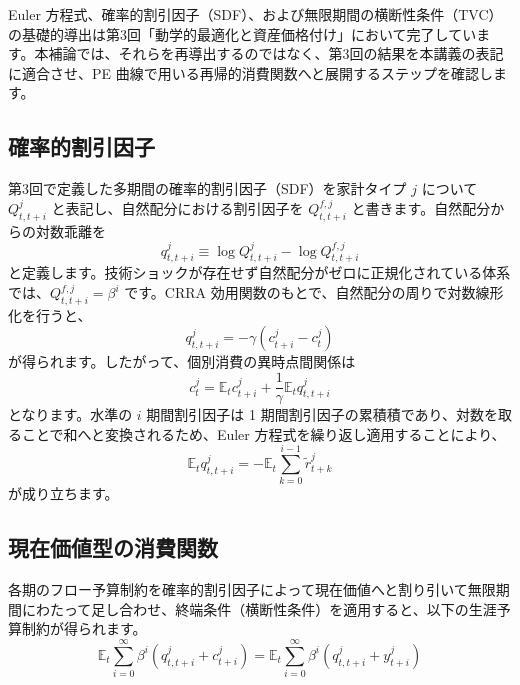 \documentclass[
  japanese,
  lualatex,
  ja=standard,
  12pt,
  a4paper]{ltjsarticle}
\begin{document}
\begin{tcolorbox}[enhanced jigsaw, arc=.35mm, bottomrule=.15mm, bottomtitle=1mm, breakable, colback=white, colbacktitle=quarto-callout-note-color!10!white, colframe=quarto-callout-note-color-frame, coltitle=black, left=2mm, leftrule=.75mm, opacityback=0, opacitybacktitle=0.6, rightrule=.15mm, title=\textcolor{quarto-callout-note-color}{\faInfo}\hspace{0.5em}{第3回との関係}, titlerule=0mm, toprule=.15mm, toptitle=1mm]

Euler
方程式、確率的割引因子（SDF）、および無限期間の横断性条件（TVC）の基礎的導出は第3回「動学的最適化と資産価格付け」において完了しています。本補論では、それらを再導出するのではなく、第3回の結果を本講義の表記に適合させ、PE
曲線で用いる再帰的消費関数へと展開するステップを確認します。

\end{tcolorbox}


\subsection{確率的割引因子}\label{ux78baux7387ux7684ux5272ux5f15ux56e0ux5b50}

第3回で定義した多期間の確率的割引因子（SDF）を家計タイプ \(j\) について
\(Q_{t,t+i}^j\) と表記し、自然配分における割引因子を \(Q_{t,t+i}^{f,j}\)
と書きます。自然配分からの対数乖離を \[
q_{t,t+i}^j \equiv \log Q_{t,t+i}^j - \log Q_{t,t+i}^{f,j}
\]
と定義します。技術ショックが存在せず自然配分がゼロに正規化されている体系では、\(Q_{t,t+i}^{f,j} = \beta^i\)
です。CRRA 効用関数のもとで、自然配分の周りで対数線形化を行うと、 \[
q_{t,t+i}^j = -\gamma(c_{t+i}^j - c_t^j)
\] が得られます。したがって、個別消費の異時点間関係は \[
c_t^j = \mathbb{E}_t c_{t+i}^j + \frac{1}{\gamma}\mathbb{E}_t q_{t,t+i}^j
\] となります。水準の \(i\) 期間割引因子は 1
期間割引因子の累積積であり、対数を取ることで和へと変換されるため、Euler
方程式を繰り返し適用することにより、 \[
\mathbb{E}_t q_{t,t+i}^j = -\mathbb{E}_t \sum_{k=0}^{i-1} \widetilde{r}_{t+k}^j
\] が成り立ちます。


\subsection{現在価値型の消費関数}\label{ux73feux5728ux4fa1ux5024ux578bux306eux6d88ux8cbbux95a2ux6570}

各期のフロー予算制約を確率的割引因子によって現在価値へと割り引いて無限期間にわたって足し合わせ、終端条件（横断性条件）を適用すると、以下の生涯予算制約が得られます。
\[
\mathbb{E}_t \sum_{i=0}^{\infty} \beta^i (q_{t,t+i}^j + c_{t+i}^j)
=
\mathbb{E}_t \sum_{i=0}^{\infty} \beta^i (q_{t,t+i}^j + y_{t+i}^j)
\]
\end{document}

